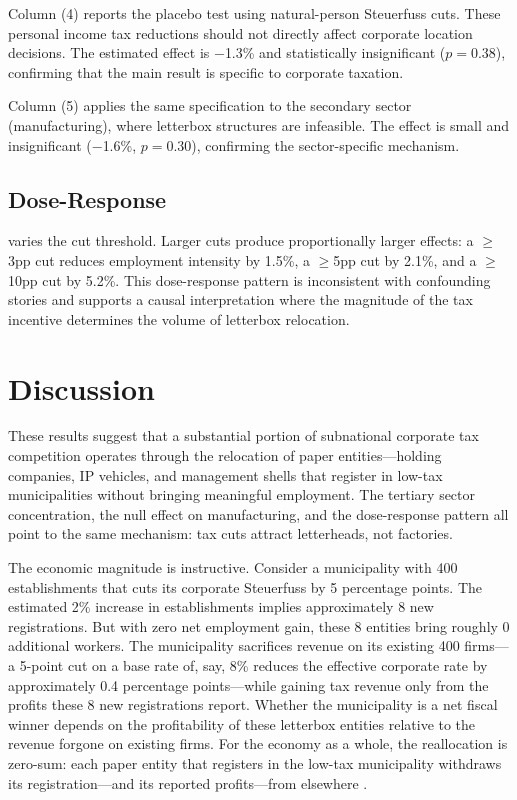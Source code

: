 \documentclass[12pt]{article}
\begin{document}
Column (4) reports the placebo test using natural-person Steuerfuss cuts. These personal income tax reductions should not directly affect corporate location decisions. The estimated effect is $-$1.3\% and statistically insignificant ($p = 0.38$), confirming that the main result is specific to corporate taxation.

Column (5) applies the same specification to the secondary sector (manufacturing), where letterbox structures are infeasible. The effect is small and insignificant ($-$1.6\%, $p = 0.30$), confirming the sector-specific mechanism.

\subsection{Dose-Response}



 varies the cut threshold. Larger cuts produce proportionally larger effects: a $\geq$3pp cut reduces employment intensity by 1.5\%, a $\geq$5pp cut by 2.1\%, and a $\geq$10pp cut by 5.2\%. This dose-response pattern is inconsistent with confounding stories and supports a causal interpretation where the magnitude of the tax incentive determines the volume of letterbox relocation.

\section{Discussion}

These results suggest that a substantial portion of subnational corporate tax competition operates through the relocation of paper entities---holding companies, IP vehicles, and management shells that register in low-tax municipalities without bringing meaningful employment. The tertiary sector concentration, the null effect on manufacturing, and the dose-response pattern all point to the same mechanism: tax cuts attract letterheads, not factories.

The economic magnitude is instructive. Consider a municipality with 400 establishments that cuts its corporate Steuerfuss by 5 percentage points. The estimated 2\% increase in establishments implies approximately 8 new registrations. But with zero net employment gain, these 8 entities bring roughly 0 additional workers. The municipality sacrifices revenue on its existing 400 firms---a 5-point cut on a base rate of, say, 8\% reduces the effective corporate rate by approximately 0.4 percentage points---while gaining tax revenue only from the profits these 8 new registrations report. Whether the municipality is a net fiscal winner depends on the profitability of these letterbox entities relative to the revenue forgone on existing firms. For the economy as a whole, the reallocation is zero-sum: each paper entity that registers in the low-tax municipality withdraws its registration---and its reported profits---from elsewhere \citep{fajgelbaum2019state}.
\end{document}
